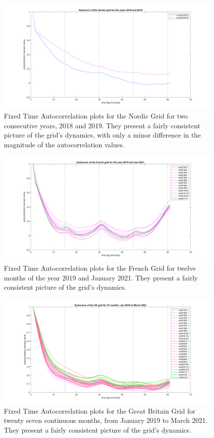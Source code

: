 \begin{figure}[!ht]
	\includegraphics[scale=0.25]{../figures/autocorr/fautocorrs_nordic_201801_to_201912}
	\caption{Fixed Time Autocorrelation plots for the Nordic Grid for two consecutive years, 2018 and 2019. They present a fairly consistent picture of the grid's dynamics, with only a minor difference in the magnitude of the autocorrelation values.}
\end{figure}


\begin{figure}[!ht]
	\includegraphics[scale=0.25]{../figures/autocorr/fautocorrs_rte_201901_to_201912_202101}
	\caption{Fixed Time Autocorrelation plots for the French Grid for twelve months of the year 2019 and January 2021. They present a fairly consistent picture of the grid's dynamics.}
\end{figure}

\begin{figure}[!ht]
	\includegraphics[scale=0.25]{../figures/autocorr/fautocorrs_uk_201901_to_202103_2}
	\caption{Fixed Time Autocorrelation plots for the Great Britain Grid for twenty seven continuous months, from January 2019 to March 2021. They present a fairly consistent picture of the grid's dynamics.}
\end{figure}

